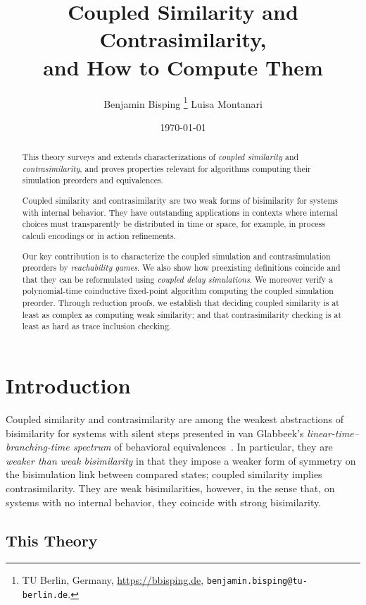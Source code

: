 \documentclass[10pt,a4paper]{article}
\title{ \textbf{Coupled Similarity and Contrasimilarity,} \\ \Large and How to Compute Them }
\author{ Benjamin Bisping%
  \footnote{TU Berlin, Germany,
    \url{https://bbisping.de}, \texttt{benjamin.bisping@tu-berlin.de}.}%
  \qquad Luisa Montanari%
 }
\date{\today}
\begin{document}
\maketitle

\begin{abstract}
\noindent
This theory surveys and extends characterizations of \emph{coupled similarity} and \emph{contrasimilarity},
and proves properties relevant for algorithms computing their simulation preorders and equivalences.

Coupled similarity and contrasimilarity are two weak forms of bisimilarity for systems with
internal behavior.
They have outstanding applications in contexts where internal choices must transparently be
distributed in time or space, for example, in process calculi encodings or in action refinements.

Our key contribution is to characterize the coupled simulation and contrasimulation preorders by \emph{reachability games}.
We also show how preexisting definitions coincide and that they can be reformulated using \emph{coupled delay simulations}.
We moreover verify a polynomial-time coinductive fixed-point algorithm computing the coupled simulation preorder.
Through reduction proofs, we establish that deciding coupled similarity is at least as complex
as computing weak similarity; and that contrasimilarity checking is at least as hard as trace inclusion
checking.
\end{abstract}

\tableofcontents

\section{Introduction}

Coupled similarity and contrasimilarity are among the weakest abstractions of bisimilarity for systems
with silent steps presented in van Glabbeek's \emph{linear-time--branching-time spectrum} of behavioral
equivalences~\cite{glabbeek1993ltbt}.
In particular, they are \emph{weaker than weak bisimilarity} in that they impose a weaker form of
symmetry on the bisimulation link between compared states; coupled similarity implies
contrasimilarity. They are weak bisimilarities, however, in the sense
that, on systems with no internal behavior, they coincide with strong bisimilarity.

\subsection{This Theory}
\end{document}
